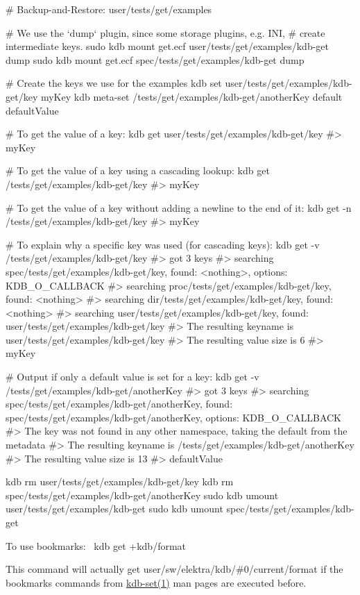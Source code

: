 \begin{DoxyCode}
# Backup-and-Restore: user/tests/get/examples

# We use the `dump` plugin, since some storage plugins, e.g. INI,
# create intermediate keys.
sudo kdb mount get.ecf user/tests/get/examples/kdb-get dump
sudo kdb mount get.ecf spec/tests/get/examples/kdb-get dump

# Create the keys we use for the examples
kdb set user/tests/get/examples/kdb-get/key myKey
kdb meta-set /tests/get/examples/kdb-get/anotherKey default defaultValue

# To get the value of a key:
kdb get user/tests/get/examples/kdb-get/key
#> myKey

# To get the value of a key using a cascading lookup:
kdb get /tests/get/examples/kdb-get/key
#> myKey

# To get the value of a key without adding a newline to the end of it:
kdb get -n /tests/get/examples/kdb-get/key
#> myKey

# To explain why a specific key was used (for cascading keys):
kdb get -v /tests/get/examples/kdb-get/key
#> got 3 keys
#> searching spec/tests/get/examples/kdb-get/key, found: <nothing>, options: KDB\_O\_CALLBACK
#>     searching proc/tests/get/examples/kdb-get/key, found: <nothing>
#>     searching dir/tests/get/examples/kdb-get/key, found: <nothing>
#>     searching user/tests/get/examples/kdb-get/key, found: user/tests/get/examples/kdb-get/key
#> The resulting keyname is user/tests/get/examples/kdb-get/key
#> The resulting value size is 6
#> myKey

# Output if only a default value is set for a key:
kdb get -v /tests/get/examples/kdb-get/anotherKey
#> got 3 keys
#> searching spec/tests/get/examples/kdb-get/anotherKey, found: spec/tests/get/examples/kdb-get/anotherKey,
       options: KDB\_O\_CALLBACK
#> The key was not found in any other namespace, taking the default from the metadata
#> The resulting keyname is /tests/get/examples/kdb-get/anotherKey
#> The resulting value size is 13
#> defaultValue

kdb rm user/tests/get/examples/kdb-get/key
kdb rm spec/tests/get/examples/kdb-get/anotherKey
sudo kdb umount user/tests/get/examples/kdb-get
sudo kdb umount spec/tests/get/examples/kdb-get
\end{DoxyCode}


To use bookmarks\+:~\newline
 {\ttfamily kdb get +kdb/format}

This command will actually get {\ttfamily user/sw/elektra/kdb/\#0/current/format} if the bookmarks commands from \hyperlink{doc_help_kdb-set_md}{kdb-\/set(1)} man pages are executed before.


